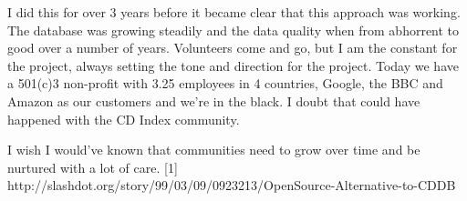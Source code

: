 I did this for over 3 years before it became clear that this approach was working. The database was growing steadily and the data quality when from abhorrent to good over a number of years.  Volunteers come and go, but I am the constant for the project, always setting the tone and direction for the project. Today we have a 501(c)3 non-profit with 3.25 employees in 4 countries, Google, the BBC and Amazon as our customers and we’re in the black. I doubt that could have happened with the CD Index community.

I wish I would've known that communities need to grow over time and be nurtured with a lot of care.
[1] http://slashdot.org/story/99/03/09/0923213/OpenSource-Alternative-to-CDDB
